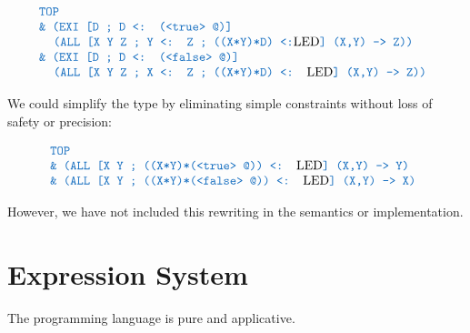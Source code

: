 \documentclass[acmsmall]{acmart}
\theoremstyle{definition}
\begin{document}
\[
  \begin{array}[t]{@{} l}
    \obj{TOP}
    \\
    \obj{\& (EXI [D ; D <: (<true> @)]}
    \\
    \I \obj{(ALL [X Y Z ; Y <: Z ; ((X*Y)*D) <:}\text{LED}\obj{] (X,Y) -> Z))}
    \\
    \obj{\& (EXI [D ; D <: (<false> @)]}
    \\
    \I \obj{(ALL [X Y Z ; X <: Z ; ((X*Y)*D) <: }\text{LED}\obj{] (X,Y) -> Z))}
  \end{array}
\]

We could simplify the type by eliminating simple constraints without loss of safety or precision:

\[
  \begin{array}[t]{@{} l}
    \obj{TOP}
    \\
    \obj{\& (ALL [X Y ; ((X*Y)*(<true> @)) <: }\text{LED}\obj{] (X,Y) -> Y)}
    \\
    \obj{\& (ALL [X Y ; ((X*Y)*(<false> @)) <: }\text{LED}\obj{] (X,Y) -> X)}
  \end{array}
\]

However, we have not included this rewriting in the semantics or implementation. 





\section{Expression System}
The programming language is pure and applicative. 
\end{document}
